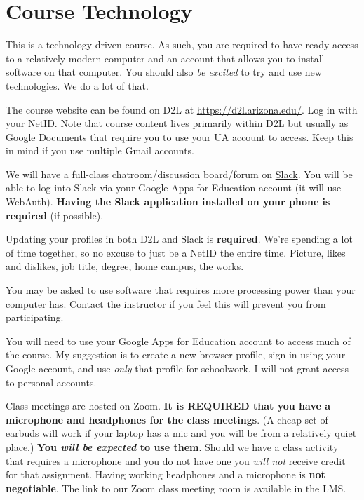 \documentclass[]{article}
\begin{document}
\hypertarget{course-technology}{%
\section{Course Technology}\label{course-technology}}

This is a technology-driven course. As such, you are required to have
ready access to a relatively modern computer and an account that allows
you to install software on that computer. You should also \emph{be
excited} to try and use new technologies. We do a lot of that.

The course website can be found on D2L at
\url{https://d2l.arizona.edu/}. Log in with your NetID. Note that course
content lives primarily within D2L but usually as Google Documents that
require you to use your UA account to access. Keep this in mind if you
use multiple Gmail accounts.

We will have a full-class chatroom/discussion board/forum on
\href{https://uasouth.slack.com}{Slack}. You will be able to log into
Slack via your Google Apps for Education account (it will use WebAuth).
\textbf{Having the Slack application installed on your phone is
required} (if possible).

Updating your profiles in both D2L and Slack is \textbf{required}. We're
spending a lot of time together, so no excuse to just be a NetID the
entire time. Picture, likes and dislikes, job title, degree, home
campus, the works.

You may be asked to use software that requires more processing power
than your computer has. Contact the instructor if you feel this will
prevent you from participating.

You will need to use your Google Apps for Education account to access
much of the course. My suggestion is to create a new browser profile,
sign in using your Google account, and use \emph{only} that profile for
schoolwork. I will not grant access to personal accounts.

Class meetings are hosted on Zoom. \textbf{It is REQUIRED that you have
a microphone and headphones for the class meetings}. (A cheap set of
earbuds will work if your laptop has a mic and you will be from a
relatively quiet place.) \textbf{You \emph{will be expected} to use
them}. Should we have a class activity that requires a microphone and
you do not have one you \emph{will not} receive credit for that
assignment. Having working headphones and a microphone is \textbf{not
negotiable}. The link to our Zoom class meeting room is available in the
LMS.
\end{document}
